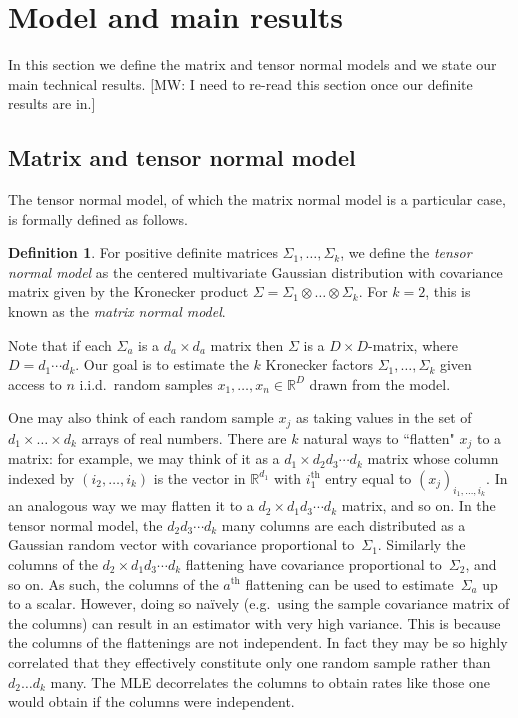 \documentclass[aos]{imsart}
\theoremstyle{definition}
\newtheorem*{definition}{Definition}
\numberwithin{equation}{section}
\newcommand{\R}{{\mathbb{R}}}
\newcommand{\ot}{\otimes}
\newcommand{\MW}[1]{{\color{red}[MW: #1]}}
\begin{document}
\section{Model and main results}\label{sec:main results}
In this section we define the matrix and tensor normal models and we state our main technical results.
\MW{I need to re-read this section once our definite results are in.}

\subsection{Matrix and tensor normal model}\label{subsec:model}
The tensor normal model, of which the matrix normal model is a particular case, is formally defined as follows.

\begin{definition}
For positive definite matrices $\Sigma_1,\dots,\Sigma_k$, we define the \emph{tensor normal model} as the centered multivariate Gaussian distribution with covariance matrix given by the Kronecker product $\Sigma = \Sigma_1 \ot \dots \ot \Sigma_k$.
For $k=2$, this is known as the \emph{matrix normal model}.
\end{definition}

\noindent
Note that if each $\Sigma_a$ is a $d_a\times d_a$ matrix then $\Sigma$ is a $D\times D$-matrix, where $D=d_1 \cdots d_k$.
Our goal is to estimate the $k$ Kronecker factors $\Sigma_1, \dots, \Sigma_k$ given access to $n$ i.i.d.\ random samples $x_1, \dots, x_n \in \R^D$ drawn from the model.

One may also think of each random sample $x_j$ as taking values in the set of $d_1 \times \dots \times d_k$ arrays of real numbers.
There are $k$ natural ways to ``flatten" $x_j$ to a matrix:
for example, we may think of it as a $d_1 \times d_2d_3\cdots{}d_k$ matrix whose column indexed by $(i_2,\dots, i_k)$ is the vector in $\R^{d_1}$ with $i_1^{\text{th}}$ entry equal to $(x_j)_{i_1, \dots, i_k}$.
In an analogous way we may flatten it to a $d_2 \times d_1d_3\cdots{}d_k$ matrix, and so on.
In the tensor normal model, the $d_2d_3\cdots{}d_k$ many columns are each distributed as a Gaussian random vector with covariance proportional to~$\Sigma_1$.
Similarly the columns of the $d_2 \times d_1d_3\cdots{}d_k$ flattening have covariance proportional to~$\Sigma_2$, and so on.
As such, the columns of the $a^{\text{th}}$ flattening can be used to estimate~$\Sigma_a$ up to a scalar.
However, doing so na\"ively (e.g.\ using the sample covariance matrix of the columns) can result in an estimator with very high variance.
This is because the columns of the flattenings are not independent.
In fact they may be so highly correlated that they effectively constitute only one random sample rather than $d_2\dots d_k$ many.
The MLE decorrelates the columns to obtain rates like those one would obtain if the columns were independent.
\end{document}
